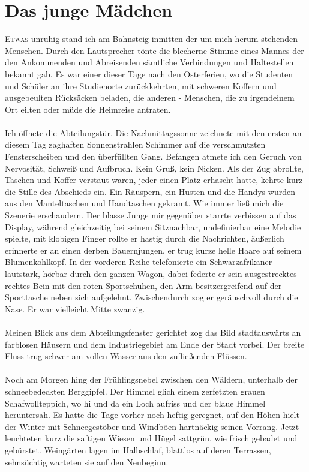 \chapter{Das junge Mädchen}
\lettrine{E}{twas} unruhig stand ich am Bahnsteig inmitten der um mich herum stehenden Menschen. Durch den Lautsprecher tönte die blecherne Stimme eines Mannes der den Ankommenden und Abreisenden sämtliche Verbindungen und Haltestellen bekannt gab. Es war einer dieser Tage nach den Osterferien, wo die Studenten und Schüler an ihre Studienorte zurückkehrten, mit schweren Koffern und ausgebeulten Rücksäcken beladen, die anderen -  Menschen, die zu irgendeinem Ort eilten oder müde die Heimreise antraten. \\\\
Ich öffnete die Abteilungstür. Die Nachmittagssonne zeichnete mit den ersten an diesem Tag  zaghaften Sonnenstrahlen Schimmer auf die verschmutzten Fensterscheiben und den überfüllten Gang. Befangen atmete ich den Geruch von Nervosität, Schweiß und Aufbruch. Kein Gruß, kein Nicken. Als der Zug abrollte, Taschen und Koffer verstaut waren, jeder einen Platz erhascht hatte, kehrte kurz die Stille des Abschieds ein. Ein Räuspern, ein Husten und die Handys wurden aus den Manteltaschen und Handtaschen gekramt. Wie immer ließ mich die Szenerie erschaudern. Der blasse Junge mir gegenüber starrte verbissen auf das Display, während gleichzeitig bei seinem Sitznachbar, undefinierbar eine Melodie spielte, mit klobigen Finger rollte er hastig durch die Nachrichten, äußerlich erinnerte er an einen derben Bauernjungen, er trug kurze helle Haare auf seinem Blumenkohlkopf. In der vorderen Reihe telefonierte ein Schwarzafrikaner lautstark, hörbar durch den ganzen Wagon, dabei federte er sein ausgestrecktes rechtes Bein mit den roten Sportschuhen, den Arm besitzergreifend auf der Sporttasche neben sich aufgelehnt. Zwischendurch zog er geräuschvoll durch die Nase. Er war vielleicht Mitte zwanzig.\\\\
Meinen Blick aus dem Abteilungsfenster gerichtet zog das Bild stadtauswärts an farblosen Häusern und dem Industriegebiet am Ende der Stadt vorbei. Der breite Fluss trug schwer am vollen Wasser aus den zufließenden Flüssen. \\\\
Noch am Morgen hing der Frühlingsnebel zwischen den Wäldern, unterhalb der schneebedeckten Berggipfel. Der Himmel glich einem zerfetzten grauen Schafwollteppich, wo hi und da ein Loch aufriss und der blaue Himmel heruntersah. Es hatte die Tage vorher noch heftig geregnet, auf den Höhen hielt der Winter mit Schneegestöber und Windböen hartnäckig seinen Vorrang. Jetzt leuchteten kurz die saftigen Wiesen und Hügel sattgrün, wie frisch gebadet und gebürstet. Weingärten lagen im Halbschlaf, blattlos auf deren Terrassen, sehnsüchtig warteten sie auf den Neubeginn. \\\\
